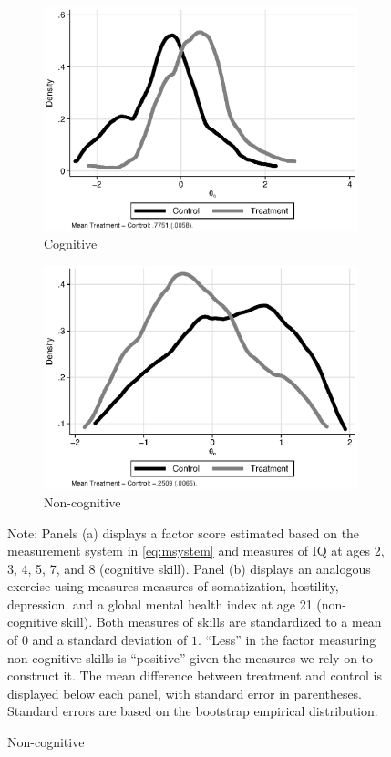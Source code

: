 \begin{figure}[!htbp]
\centering
\caption{Estimates of Cognitive ($\theta_{c}^d$) and Non-cognitive Skills ($\theta_{n}^d$)}\label{figure:factorsm}
\begin{subfigure}[h]{0.5\textwidth}
		\centering
		\caption{Cognitive} \label{fig:c}
		\includegraphics[width=\textwidth]{output/abccare_cfactor.eps}
\end{subfigure}%
\begin{subfigure}[h]{0.5\textwidth}
	\centering
	\caption{Non-cognitive} \label{fig:n}
		\includegraphics[width=\textwidth]{output/abccare_nfactor.eps}
\end{subfigure}
\footnotesize \justify
Note: Panels (a) displays a factor score estimated based on the measurement system in \eqref{eq:msystem} and measures of IQ at ages 2, 3, 4, 5, 7, and 8 (cognitive skill). Panel (b) displays an analogous exercise using measures measures of somatization, hostility, depression, and a global mental health index at age 21 (non-cognitive skill). Both measures of skills are standardized to a mean of $0$ and a standard deviation of $1$. ``Less'' in the factor measuring non-cognitive skills is ``positive'' given the measures we rely on to construct it. The mean difference between treatment and control is displayed below each panel, with standard error in parentheses. Standard errors are based on the bootstrap empirical distribution.
\end{figure}

